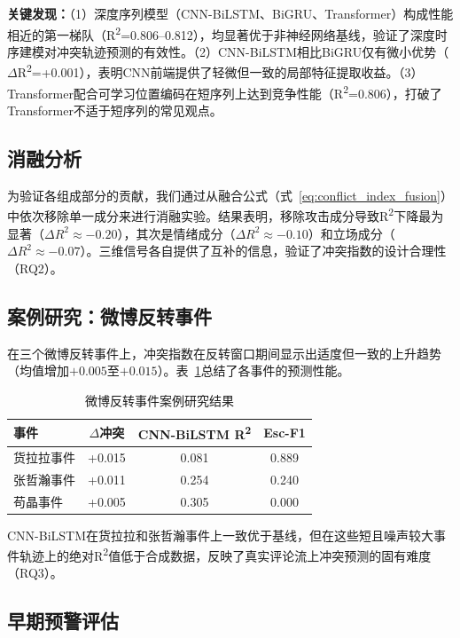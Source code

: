 \documentclass[conference]{IEEEtran}
\begin{document}
\noindent\textbf{关键发现：}（1）深度序列模型（CNN-BiLSTM、BiGRU、Transformer）构成性能相近的第一梯队（R\textsuperscript{2}=0.806--0.812），均显著优于非神经网络基线，验证了深度时序建模对冲突轨迹预测的有效性。（2）CNN-BiLSTM相比BiGRU仅有微小优势（$\Delta$R\textsuperscript{2}=+0.001），表明CNN前端提供了轻微但一致的局部特征提取收益。（3）Transformer配合可学习位置编码在短序列上达到竞争性能（R\textsuperscript{2}=0.806），打破了Transformer不适于短序列的常见观点。

\subsection{消融分析}

为验证各组成部分的贡献，我们通过从融合公式（式~\ref{eq:conflict_index_fusion}）中依次移除单一成分来进行消融实验。结果表明，移除攻击成分导致R\textsuperscript{2}下降最为显著（$\Delta R^2 \approx -0.20$），其次是情绪成分（$\Delta R^2 \approx -0.10$）和立场成分（$\Delta R^2 \approx -0.07$）。三维信号各自提供了互补的信息，验证了冲突指数的设计合理性（RQ2）。

\subsection{案例研究：微博反转事件}

在三个微博反转事件上，冲突指数在反转窗口期间显示出适度但一致的上升趋势（均值增加$+0.005$至$+0.015$）。表~\ref{tab:case_study}总结了各事件的预测性能。

\begin{table}[h]
\caption{微博反转事件案例研究结果}
\label{tab:case_study}
\centering
\begin{tabular}{lccc}
\hline
\textbf{事件} & \textbf{$\Delta$冲突} & \textbf{CNN-BiLSTM R\textsuperscript{2}} & \textbf{Esc-F1} \\
\hline
货拉拉事件 & +0.015 & 0.081 & 0.889 \\
张哲瀚事件 & +0.011 & 0.254 & 0.240 \\
苟晶事件 & +0.005 & 0.305 & 0.000 \\
\hline
\end{tabular}
\end{table}

\noindent CNN-BiLSTM在货拉拉和张哲瀚事件上一致优于基线，但在这些短且噪声较大事件轨迹上的绝对R\textsuperscript{2}值低于合成数据，反映了真实评论流上冲突预测的固有难度（RQ3）。

\subsection{早期预警评估}
\end{document}
